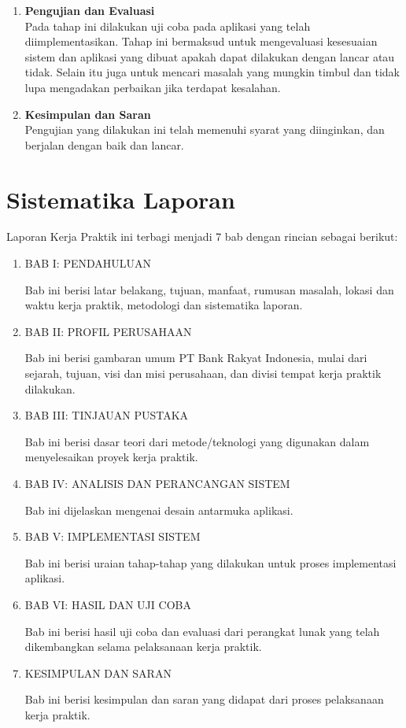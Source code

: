 \begin{enumerate}
	\item \textbf{Pengujian dan Evaluasi}\\
	\tab Pada tahap ini dilakukan uji coba pada aplikasi yang telah diimplementasikan. Tahap ini bermaksud untuk mengevaluasi kesesuaian sistem dan aplikasi yang dibuat apakah dapat dilakukan dengan lancar atau tidak. Selain itu juga untuk mencari masalah yang mungkin timbul dan tidak lupa mengadakan perbaikan jika terdapat kesalahan.\\
	\item \textbf{Kesimpulan dan Saran}\\
	\tab Pengujian yang dilakukan ini telah memenuhi syarat yang diinginkan, dan berjalan dengan baik dan lancar.
\end{enumerate}

\section{Sistematika Laporan}
Laporan Kerja Praktik ini terbagi menjadi 7 bab dengan rincian sebagai berikut:
	\begin{enumerate}
	\item BAB I: PENDAHULUAN
	
	Bab ini berisi latar belakang, tujuan, manfaat, rumusan masalah, lokasi dan waktu kerja praktik, metodologi dan sistematika laporan.
		
	\item BAB II: PROFIL PERUSAHAAN
		
	Bab ini berisi gambaran umum PT Bank Rakyat Indonesia, mulai dari sejarah, tujuan, visi dan misi perusahaan, dan divisi tempat kerja praktik dilakukan.
		
	\item BAB III: TINJAUAN PUSTAKA
		
	Bab ini berisi dasar teori dari metode/teknologi yang digunakan dalam menyelesaikan proyek kerja praktik.
		
	\item BAB IV: ANALISIS DAN PERANCANGAN SISTEM
		
	Bab ini dijelaskan mengenai desain antarmuka aplikasi.
		
	\item BAB V: IMPLEMENTASI SISTEM
		
	Bab ini berisi uraian tahap-tahap yang dilakukan untuk proses implementasi aplikasi.
		
	\item BAB VI: HASIL DAN UJI COBA
	
	Bab ini berisi hasil uji coba dan evaluasi dari perangkat lunak yang telah dikembangkan selama pelaksanaan kerja praktik.
	
	\item KESIMPULAN DAN SARAN
	
	Bab ini berisi kesimpulan dan saran yang didapat dari proses pelaksanaan kerja praktik.
	\end{enumerate}

\cleardoublepage
